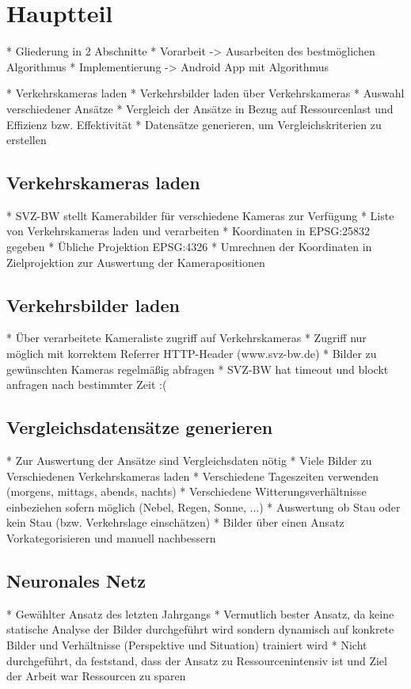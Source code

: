 \chapter{Hauptteil}
* Gliederung in 2 Abschnitte
* Vorarbeit -> Ausarbeiten des bestmöglichen Algorithmus
* Implementierung -> Android App mit Algorithmus

* Verkehrskameras laden
* Verkehrsbilder laden über Verkehrskameras
* Auswahl verschiedener Ansätze
* Vergleich der Ansätze in Bezug auf Ressourcenlast und Effizienz bzw. Effektivität
* Datensätze generieren, um Vergleichskriterien zu erstellen

\section{Verkehrskameras laden}
* SVZ-BW stellt Kamerabilder für verschiedene Kameras zur Verfügung
* Liste von Verkehrskameras laden und verarbeiten %
* Koordinaten in EPSG:25832 gegeben %
* Übliche Projektion EPSG:4326 %
* Umrechnen der Koordinaten in Zielprojektion zur Auswertung der Kamerapositionen

\section{Verkehrsbilder laden}
* Über verarbeitete Kameraliste zugriff auf Verkehrskameras
* Zugriff nur möglich mit korrektem Referrer HTTP-Header (www.svz-bw.de)
* Bilder zu gewünschten Kameras regelmäßig abfragen
* SVZ-BW hat timeout und blockt anfragen nach bestimmter Zeit :(

\section{Vergleichsdatensätze generieren}
* Zur Auswertung der Ansätze sind Vergleichsdaten nötig
* Viele Bilder zu Verschiedenen Verkehrskameras laden
* Verschiedene Tageszeiten verwenden (morgens, mittags, abends, nachts)
* Verschiedene Witterungsverhältnisse einbeziehen sofern möglich (Nebel, Regen, Sonne, ...)
* Auswertung ob Stau oder kein Stau (bzw. Verkehrslage einschätzen)
* Bilder über einen Ansatz Vorkategorisieren und manuell nachbessern

\section{Neuronales Netz}
* Gewählter Ansatz des letzten Jahrgangs
* Vermutlich bester Ansatz, da keine statische Analyse der Bilder durchgeführt wird
	sondern dynamisch auf konkrete Bilder und Verhältnisse (Perspektive und Situation) trainiert wird
* Nicht durchgeführt, da feststand, dass der Ansatz zu Ressourcenintensiv ist und Ziel der Arbeit war Ressourcen zu sparen

